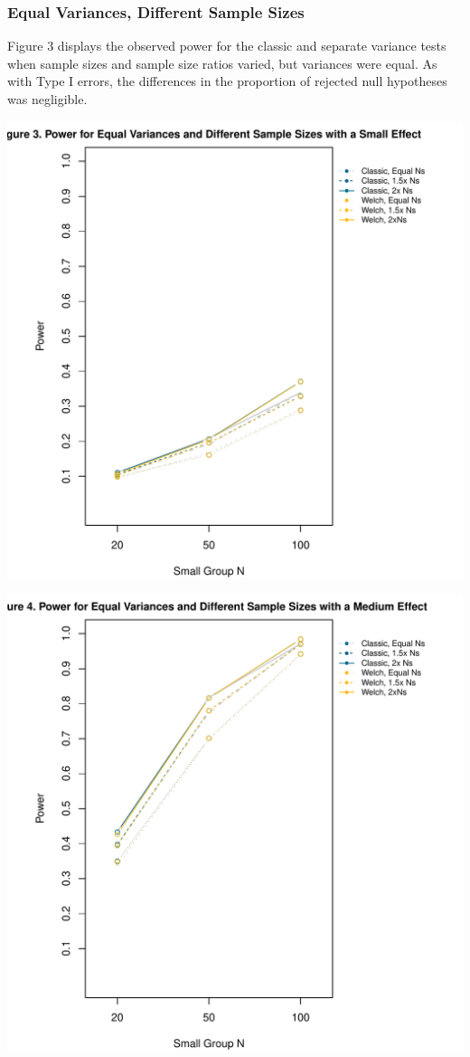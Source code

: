 \documentclass[man]{apa6}\usepackage[]{graphicx}\usepackage[]{color}
\makeatletter
\def\maxwidth{ %
  \ifdim\Gin@nat@width>\linewidth
    \linewidth
  \else
    \Gin@nat@width
  \fi
}
\newenvironment{knitrout}{}{} %
\makeatother
\begin{document}
\subsubsection{Equal Variances, Different Sample Sizes}
Figure 3 displays the observed power for the classic and separate variance tests when sample sizes and sample size ratios varied, but variances were equal. As with Type I errors, the differences in the proportion of rejected null hypotheses was negligible. 

\begin{knitrout}
\color{fgcolor}
\includegraphics[width=\maxwidth]{figure/equal_vars_unequal_Ns_small_d1} 

\includegraphics[width=\maxwidth]{figure/equal_vars_unequal_Ns_small_d2} 


\end{knitrout}
\end{document}
